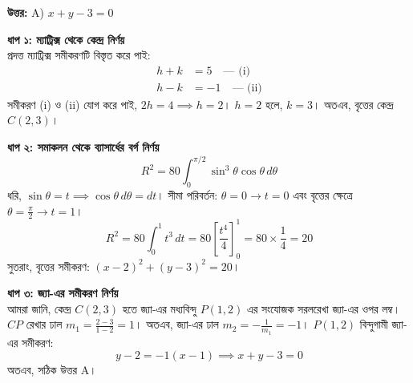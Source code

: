 \documentclass[12pt, a4paper]{article}
\begin{document}
\vspace{0.5em}
\begin{tcolorbox}[answerbox]
    \textbf{\color{success} উত্তর:} A) $x + y - 3 = 0$
\end{tcolorbox}
\vspace{1em}

\begin{tcolorbox}[solutionbox={সমাধান (Solution)}]
    \noindent
    \textbf{ধাপ ১: ম্যাট্রিক্স থেকে কেন্দ্র নির্ণয়} \\
    প্রদত্ত ম্যাট্রিক্স সমীকরণটি বিস্তৃত করে পাই:
    \begin{align*}
        h + k &= 5 \quad \text{--- (i)} \\
        h - k &= -1 \quad \text{--- (ii)}
    \end{align*}
    সমীকরণ (i) ও (ii) যোগ করে পাই, $2h = 4 \implies h = 2$। 
    $h = 2$ হলে, $k = 3$। অতএব, বৃত্তের কেন্দ্র $C(2, 3)$।
    
    \vspace{0.5em}
    \noindent\textbf{ধাপ ২: সমাকলন থেকে ব্যাসার্ধের বর্গ নির্ণয়} \\
    \[ R^2 = 80 \int_0^{\pi/2} \sin^3\theta \cos\theta \, d\theta \]
    ধরি, $\sin\theta = t \implies \cos\theta \, d\theta = dt$। 
    সীমা পরিবর্তন: $\theta = 0 \rightarrow t = 0$ এবং বৃত্তের ক্ষেত্রে $\theta = \frac{\pi}{2} \rightarrow t = 1$।
    \[ R^2 = 80 \int_0^1 t^3 \, dt = 80 \left[ \frac{t^4}{4} \right]_0^1 = 80 \times \frac{1}{4} = 20 \]
    সুতরাং, বৃত্তের সমীকরণ: $(x - 2)^2 + (y - 3)^2 = 20$।
    
    \vspace{0.5em}
    \noindent\textbf{ধাপ ৩: জ্যা-এর সমীকরণ নির্ণয়} \\
    আমরা জানি, কেন্দ্র $C(2, 3)$ হতে জ্যা-এর মধ্যবিন্দু $P(1, 2)$ এর সংযোজক সরলরেখা জ্যা-এর ওপর লম্ব। 
    $CP$ রেখার ঢাল $m_1 = \frac{2 - 3}{1 - 2} = 1$। অতএব, জ্যা-এর ঢাল $m_2 = -\frac{1}{m_1} = -1$। 
    $P(1, 2)$ বিন্দুগামী জ্যা-এর সমীকরণ:
    \[ y - 2 = -1(x - 1) \implies x + y - 3 = 0 \]
    অতএব, সঠিক উত্তর A।
\end{tcolorbox}
\end{document}
